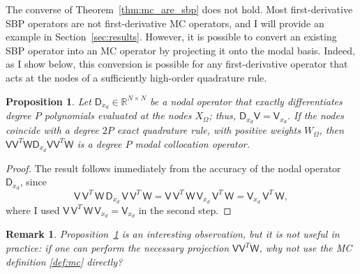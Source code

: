\documentclass[pdflatex,sn-mathphys-num]{sn-jnl}%
\theoremstyle{thmstyleone}%
\newtheorem{proposition}[theorem]{Proposition}%
\theoremstyle{thmstyletwo}%
\newtheorem{remark}{Remark}%
\theoremstyle{thmstylethree}%
\newcommand{\mat}[1]{\ensuremath{\mathsf{#1}}}
\begin{document}

The converse of Theorem~\ref{thm:mc_are_sbp} does not hold.  Most first-derivative SBP operators are not first-derivative MC operators, and I will provide an example in Section~\ref{sec:results}.  However, it is possible to convert an existing SBP operator into an MC operator by projecting it onto the modal basis.  Indeed, as I show below, this conversion is possible for any first-derivative operator that acts at the nodes of a sufficiently high-order quadrature rule.

\begin{proposition}\label{prop:convert}
Let $\mat{D}_{x_d} \in \mathbb{R}^{N \times N}$ be a nodal operator that exactly differentiates degree $P$ polynomials evaluated at the nodes $X_{\Omega}$; thus, $\mat{D}_{x_d} \mat{V} = \mat{V}_{x_d}$.  If the nodes coincide with a degree $2P$ exact quadrature rule, with positive weights $W_{\Omega}$, then $\mat{V} \mat{V}^T \mat{W} \mat{D}_{x_d} \mat{V} \mat{V}^T \mat{W}$ is a degree $P$ modal collocation operator.
\end{proposition}

\begin{proof}
The result follows immediately from the accuracy of the nodal operator $\mat{D}_{x_d}$, since
\begin{equation*}
    \mat{V}\, \mat{V}^T\, \mat{W}\, \mat{D}_{x_d}\, \mat{V}\, \mat{V}^T \,\mat{W}
    = \mat{V}\, \mat{V}^T\, \mat{W}\, \mat{V}_{x_d}\, \mat{V}^T\, \mat{W}
    = \mat{V}_{x_d} \, \mat{V}^T\, \mat{W},
\end{equation*}
where I used $\mat{V}\, \mat{V}^T\, \mat{W}\, \mat{V}_{x_d} = \mat{V}_{x_d}$ in the second step.
\end{proof}

\begin{remark}
Proposition~\ref{prop:convert} is an interesting observation, but it is not useful in practice: if one can perform the necessary projection $\mat{V}\mat{V}^{T} \mat{W}$, why not use the MC definition \ref{def:mc} directly?
\end{remark}
\end{document}
